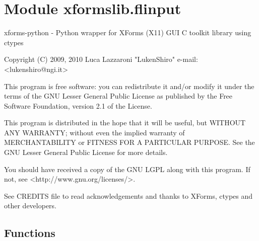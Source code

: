 %
%
%


\section{Module xformslib.flinput}

    \label{xformslib:flinput}
xforms-python - Python wrapper for XForms (X11) GUI C toolkit library using
ctypes

Copyright (C) 2009, 2010  Luca Lazzaroni "LukenShiro" e-mail: 
{\textless}lukenshiro@ngi.it{\textgreater}

This program is free software: you can redistribute it and/or modify it 
under the terms of the GNU Lesser General Public License as published by 
the Free Software Foundation, version 2.1 of the License.

This program is distributed in the hope that it will be useful, but WITHOUT
ANY WARRANTY; without even the implied warranty of MERCHANTABILITY or 
FITNESS FOR A PARTICULAR PURPOSE. See the GNU Lesser General Public License
for more details.

You should have received a copy of the GNU LGPL along with this program. If
not, see {\textless}http://www.gnu.org/licenses/{\textgreater}.

See CREDITS file to read acknowledgements and thanks to XForms, ctypes and 
other developers.



  \subsection{Functions}

    \label{xformslib:flinput:fl_add_input}

